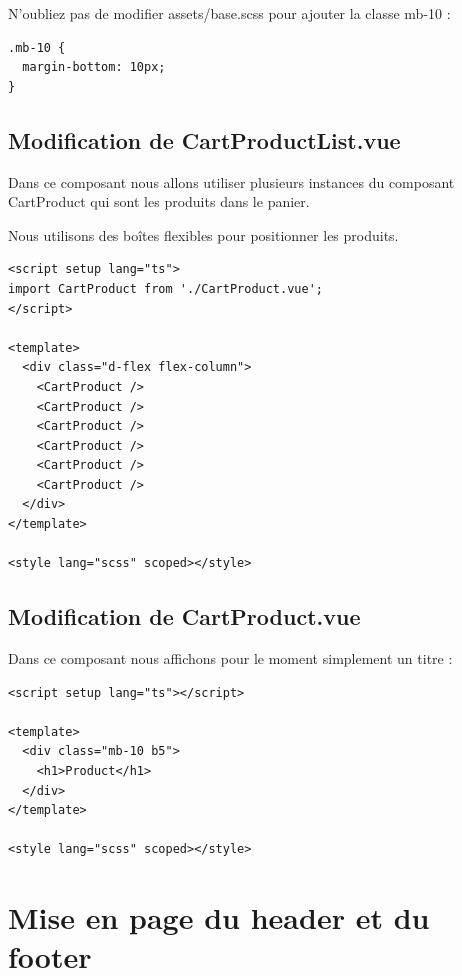 \documentclass{article}
\begin{document}
N'oubliez pas de modifier assets/base.scss pour ajouter la classe mb-10 :
\begin{verbatim}
.mb-10 {
  margin-bottom: 10px;
}
\end{verbatim}

\subsection{Modification de CartProductList.vue}
Dans ce composant nous allons utiliser plusieurs instances du composant CartProduct qui sont les produits dans le panier.

Nous utilisons des boîtes flexibles pour positionner les produits.
\begin{verbatim}
<script setup lang="ts">
import CartProduct from './CartProduct.vue';
</script>

<template>
  <div class="d-flex flex-column">
    <CartProduct />
    <CartProduct />
    <CartProduct />
    <CartProduct />
    <CartProduct />
    <CartProduct />
  </div>
</template>

<style lang="scss" scoped></style>
\end{verbatim}

\subsection{Modification de CartProduct.vue}
Dans ce composant nous affichons pour le moment simplement un titre :
\begin{verbatim}
<script setup lang="ts"></script>

<template>
  <div class="mb-10 b5">
    <h1>Product</h1>
  </div>
</template>

<style lang="scss" scoped></style>
\end{verbatim}



\section{Mise en page du header et du footer}
\end{document}
